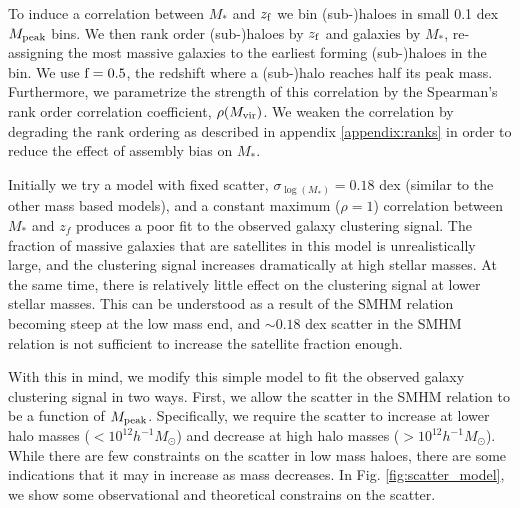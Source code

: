 \documentclass[a4paper,fleqn,usenatbib]{mnras}
\begin{document}
To induce a correlation between $M_{*}$ and $z_{\rm f}$ we bin (sub-)haloes in small 0.1 dex $M_{\rm peak}$ bins.  We then rank order (sub-)haloes by $z_{\rm f}$ and galaxies by $M_{*}$, re-assigning the most massive galaxies to the earliest forming (sub-)haloes in the bin.  We use ${\rm f}=0.5$, the redshift where a (sub-)halo reaches half its peak mass.  Furthermore, we parametrize the strength of this correlation by the Spearman’s rank order correlation coefficient, $\rho(M_{\rm vir})$.  We weaken the correlation by degrading the rank ordering as described in appendix \ref{appendix:ranks} in order to reduce the effect of assembly bias on $M_*$.

Initially we try a model with fixed scatter, $\sigma_{\log(M_*)} = 0.18$ dex (similar to the other mass based models), and a constant maximum ($\rho=1$) correlation between $M_{*}$ and $z_f$ produces a poor fit to the observed galaxy clustering signal.  The fraction of massive galaxies that are satellites in this model is unrealistically large, and the clustering signal increases dramatically at high stellar masses.  At the same time, there is relatively little effect on the clustering signal at lower stellar masses.  This can be understood as a result of the SMHM relation becoming steep at the low mass end, and $\sim 0.18$ dex scatter in the SMHM relation is not sufficient to increase the satellite fraction enough.

With this in mind, we modify this simple model to fit the observed galaxy clustering signal in two ways.  First, we allow the scatter in the SMHM relation to be a function of $M_{\rm peak}$.  Specifically, we require the scatter to increase at lower halo masses ($<10^{12}h^{-1}M_{\odot}$) and decrease at high halo masses ($>10^{12}h^{-1}M_{\odot}$).  While there are few constraints on the scatter in low mass haloes, there are some indications that it may in increase as mass decreases. In Fig. \ref{fig:scatter_model}, we show some observational and theoretical constrains on the scatter.  
\end{document}
